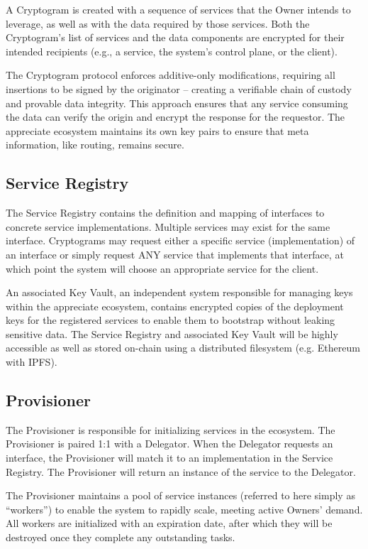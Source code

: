 \documentclass[a4paper,onecolumn, 10.5pt]{article}
\begin{document}
A Cryptogram is created with a sequence of services that the Owner intends to leverage, as well as with the data required by those services. Both the Cryptogram’s list of services and the data components are encrypted for their intended recipients (e.g., a service, the system’s control plane, or the client).

The Cryptogram protocol enforces additive-only modifications, requiring all insertions to be signed by the originator -- creating a verifiable chain of custody and provable data integrity. This approach ensures that any service consuming the data can verify the origin and encrypt the response for the requestor. The appreciate ecosystem maintains its own key pairs to ensure that meta information, like routing, remains secure.


\subsection{Service Registry}

The Service Registry contains the definition and mapping of interfaces to concrete service implementations. Multiple services may exist for the same interface. Cryptograms may request either a specific service (implementation) of an interface or simply request ANY service that implements that interface, at which point the system will choose an appropriate service for the client.

An associated Key Vault, an independent system responsible for managing keys within the appreciate ecosystem, contains encrypted copies of the deployment keys for the registered services to enable them to bootstrap without leaking sensitive data. The Service Registry and associated Key Vault will be highly accessible as well as stored on-chain using a distributed filesystem (e.g. Ethereum with IPFS\cite{ipfs}).

\subsection{Provisioner}

The Provisioner is responsible for initializing services in the ecosystem. The Provisioner is paired 1:1 with a Delegator. When the Delegator requests an interface, the Provisioner will match it to an implementation in the Service Registry. The Provisioner will return an instance of the service to the Delegator.

The Provisioner maintains a pool of service instances (referred to here simply as “workers”) to enable the system to rapidly scale, meeting active Owners’ demand. All workers are initialized with an expiration date, after which they will be destroyed once they complete any outstanding tasks.
\end{document}
